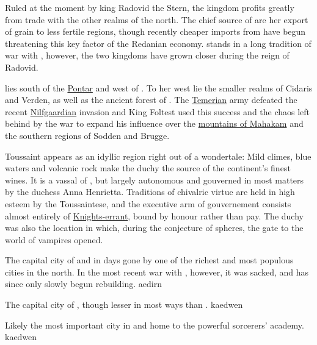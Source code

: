 {
    Ruled at the moment by king Radovid the Stern, the kingdom profits greatly from trade with the other realms of the north.
    The chief source of  are her export of grain to less fertile regions, though recently cheaper
    imports from  have begun threatening this key factor of the Redanian economy.
     stands in a long tradition of war with , however, the two kingdoms have
    grown closer during the reign of Radovid.
}

{
     lies south of the \hyperref[region:pontar]{Pontar} and west of . To her west lie the smaller realms of 
    Cidaris and Verden, as well as the ancient forest of . The \hyperref[realm:temeria]{Temerian} army defeated the recent 
    \hyperref[realm:nilfgaard]{Nilfgaardian} invasion and King Foltest used this success and the chaos left behind by the war
    to expand his influence over the \hyperref[region:mahakamMtns]{mountains of Mahakam} and the southern regions of Sodden and Brugge.
}

{
    Toussaint appears as an idyllic region right out of a wondertale: Mild climes, blue waters and volcanic rock make 
    the duchy the source of the continent's finest wines. It is a vassal of , but largely 
    autonomous and gouverned in most matters by the duchess Anna Henrietta. Traditions of chivalric virtue are held in 
    high esteem by the Toussaintese, and the executive arm of gouvernement consists almost entirely of \hyperref[profession:knight_errant]{Knights-errant},
    bound by honour rather than pay. The duchy was also the location in which, during the conjecture of spheres, the 
    gate to the world of vampires opened.
}

{
    The capital city of  and in days gone by one of the richest and most populous cities in the north. In the most recent war
    with , however, it was sacked, and has since only slowly begun rebuilding.
}
{aedirn}

{ 
    The capital city of , though lesser in most ways than .
}
{kaedwen}

{
    Likely the most important city in  and home to the powerful sorcerers' academy.
}
{kaedwen}

